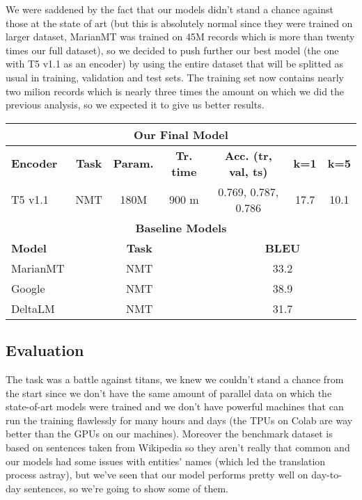 We were saddened by the fact that our models didn't stand a chance against those at the state of art (but this is absolutely normal since they were trained on larger dataset, MarianMT was trained on 45M records which is more than twenty times our full dataset), so we decided to push further our best model (the one with T5 v1.1 as an encoder) by using the entire dataset that will be splitted as usual in training, validation and test sets. The training set now contains nearly two milion records which is nearly three times the amount on which we did the previous analysis, so we expected it to give us better results.

\begin{table}[H]
\centering
\begin{tabular}{l|c|c|c|c|c|c}\hline \hline
\multicolumn{7}{c}{\textbf{Our Final Model}} \\\hline
\textbf{Encoder} & \textbf{Task} & \textbf{Param.} & \textbf{Tr. time} & \textbf{Acc. (tr, val, ts)} & \textbf{k=1} & \textbf{k=5}\\\hline
T5 v1.1 & NMT & 180M & 900 m & 0.769, 0.787, 0.786 & 17.7 & 10.1\\\hline \hline
\multicolumn{7}{c}{\textbf{Baseline Models}} \\\hline
\textbf{Model} & \multicolumn{3}{c|}{\textbf{Task}} & \multicolumn{3}{c}{\textbf{BLEU}}\\\hline
MarianMT & \multicolumn{3}{c|}{NMT} & \multicolumn{3}{c}{33.2}\\
Google & \multicolumn{3}{c|}{NMT} & \multicolumn{3}{c}{38.9}\\
DeltaLM & \multicolumn{3}{c|}{NMT} & \multicolumn{3}{c}{31.7}
\end{tabular}
\end{table}

\subsection{Evaluation}
The task was a battle against titans, we knew we couldn't stand a chance from the start since we don't have the same amount of parallel data on which the state-of-art models were trained and we don't have powerful machines that can run the training flawlessly for many hours and days (the TPUs on Colab are way better than the GPUs on our machines). Moreover the benchmark dataset is based on sentences taken from Wikipedia so they aren't really that common and our models had some issues with entities' names (which led the translation process astray), but we've seen that our model performs pretty well on day-to-day sentences, so we're going to show some of them.
